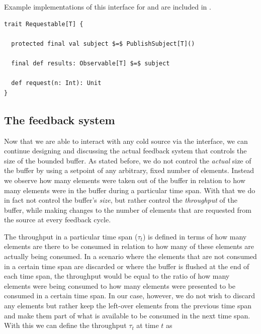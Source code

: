 Example implementations of this interface for \itr and  are included in .

\begin{minipage}{\linewidth}
\begin{lstlisting}[style=ScalaStyle, caption={Universal, interactive interface used in the feedback system}, label={lst:universal-interactive-interface}]
trait Requestable[T] {

  protected final val subject $=$ PublishSubject[T]()

  final def results: Observable[T] $=$ subject

  def request(n: Int): Unit
}
\end{lstlisting}
\end{minipage}

\subsection{The feedback system}
Now that we are able to interact with any cold source via the  interface, we can continue designing and discussing the actual feedback system that controls the size of the bounded buffer. As stated before, we do not control the \emph{actual} size of the buffer by using a setpoint of any arbitrary, fixed number of elements. Instead we observe how many elements were taken out of the buffer in relation to how many elements were in the buffer during a particular time span. With that we do in fact not control the buffer's \emph{size}, but rather control the \emph{throughput} of the buffer, while making changes to the number of elements that are requested from the source at every feedback cycle.

The throughput in a particular time span ($\tau_t$) is defined in terms of how many elements are there to be consumed in relation to how many of these elements are actually being consumed. In a scenario where the elements that are not consumed in a certain time span are discarded or where the buffer is flushed at the end of each time span, the throughput would be equal to the ratio of how many elements were being consumed to how many elements were presented to be consumed in a certain time span. In our case, however, we do not wish to discard any elements but rather keep the left-over elements from the previous time span and make them part of what is available to be consumed in the next time span. With this we can define the throughput $\tau_t$ at time $t$ as


